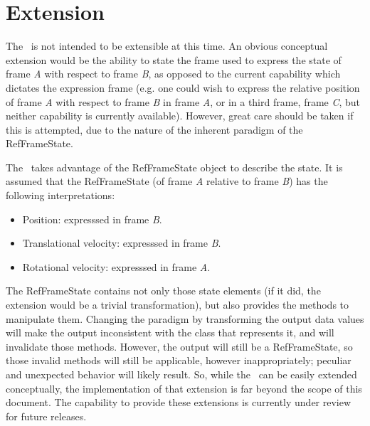 %
%
% 
%

 \section{Extension}

The \RelativeDesc\ is not intended to be extensible at this time.  An obvious conceptual extension would be the ability to state the frame used to express the state of frame \textit{A} with respect to frame \textit{B}, as opposed to the current capability which dictates the expression frame (e.g. one could wish to express the relative position of frame \textit{A} with respect to frame \textit{B} in frame \textit{A}, or in a third frame, frame \textit{C}, but neither capability is currently available).  However, great care should be taken if this is attempted, due to the nature of the inherent paradigm of the RefFrameState.

 The \RelativeDesc\ takes advantage of the RefFrameState object to describe the state.  It is assumed that the RefFrameState (of frame \textit{A} relative to frame \textit{B}) has the following interpretations:
 \begin{itemize}
  \item Position: expresssed in frame \textit{B}.
  \item Translational velocity: expresssed in frame \textit{B}.
  \item Rotational velocity: expresssed in frame \textit{A}.
 \end{itemize}
 The RefFrameState contains not only those state elements (if it did, the extension would be a trivial transformation), but also provides the methods to manipulate them.  Changing the paradigm by transforming the output data values will make the output inconsistent with the class that represents it, and will invalidate those methods.  However, the output will still be a RefFrameState, so those invalid methods will still be applicable, however inappropriately;  peculiar and unexpected behavior will likely result.  So, while the \RelativeDesc\ can be easily extended conceptually, the implementation of that extension is far beyond the scope of this document.  The capability to provide these extensions is currently under review for future releases.
 
